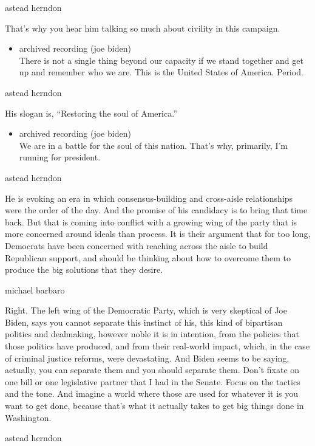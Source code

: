 astead herndon

That's why you hear him talking so much about civility in this campaign.

\begin{itemize}
\tightlist
\item
  archived recording (joe biden)\\
  There is not a single thing beyond our capacity if we stand together
  and get up and remember who we are. This is the United States of
  America. Period.
\end{itemize}

astead herndon

His slogan is, ``Restoring the soul of America.''

\begin{itemize}
\tightlist
\item
  archived recording (joe biden)\\
  We are in a battle for the soul of this nation. That's why, primarily,
  I'm running for president.
\end{itemize}

astead herndon

He is evoking an era in which consensus-building and cross-aisle
relationships were the order of the day. And the promise of his
candidacy is to bring that time back. But that is coming into conflict
with a growing wing of the party that is more concerned around ideals
than process. It is their argument that for too long, Democrats have
been concerned with reaching across the aisle to build Republican
support, and should be thinking about how to overcome them to produce
the big solutions that they desire.

michael barbaro

Right. The left wing of the Democratic Party, which is very skeptical of
Joe Biden, says you cannot separate this instinct of his, this kind of
bipartisan politics and dealmaking, however noble it is in intention,
from the policies that those politics have produced, and from their
real-world impact, which, in the case of criminal justice reforms, were
devastating. And Biden seems to be saying, actually, you can separate
them and you should separate them. Don't fixate on one bill or one
legislative partner that I had in the Senate. Focus on the tactics and
the tone. And imagine a world where those are used for whatever it is
you want to get done, because that's what it actually takes to get big
things done in Washington.

astead herndon

